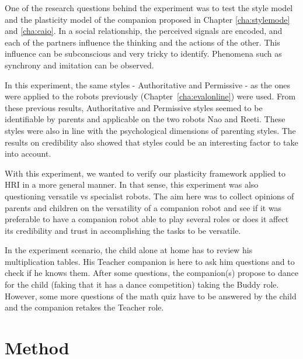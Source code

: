 \documentclass[smallextended]{svjour3}
\begin{document}
One of the research questions behind the experiment was to test the style model and the plasticity model of the companion proposed in Chapter \ref{cha:stylemode} and \ref{cha:caio}. 
In a social relationship, the perceived signals are encoded, and each of the partners influence the thinking and the actions of the other.
This influence can be subconscious and very tricky to identify. 
Phenomena such as synchrony and imitation can be observed. 

In this experiment, the same styles - Authoritative and Permissive -  as the ones were applied to the robots previously (Chapter~\ref{cha:evalonline}) were used.
From these previous results, Authoritative and Permissive styles seemed to be identifiable by parents and applicable on the two robots Nao and Reeti. 
These styles were also in line with the psychological dimensions of parenting styles. 
The results on credibility also showed that styles could be an interesting factor to take into account. 

With this experiment, we wanted to verify our plasticity framework applied to HRI in a more general manner. 
In that sense, this experiment was also questioning versatile vs specialist robots. 
The aim here was to collect opinions of parents and children on the versatility of a companion robot and see if it was preferable to have a companion robot able to play several roles or does it affect its credibility and trust in accomplishing the tasks to be versatile.

In the experiment scenario, the child alone at home has to review his multiplication tables. 
His Teacher companion is here to ask him questions and to check if he knows them. 
After some questions, the companion(s) propose to dance for the child (faking that it has a dance competition) taking the Buddy role. 
However, some more questions of the math quiz have to be answered by the child and the companion retakes the Teacher role.


\section{Method}
\end{document}
